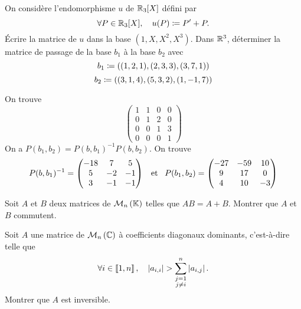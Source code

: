 \documentclass{magnolia}
\begin{document}
\begin{questions}
\question On considère l'endomorphisme $u$ de $\mathbb{R}_3[X]$ défini par
  \[\forall P\in\mathbb{R}_3[X] ,\quad u(P)\coloneqq P'+P.\]
  Écrire la matrice de $u$ dans la base $(1,X,X^2,X^3)$.
\question Dans $\mathbb{R}^3$, déterminer la matrice de passage de la base $b_1$ à la
  base $b_2$ avec
  \[b_1\coloneqq((1,2,1), (2,3,3), (3,7,1))\]
  \[b_2\coloneqq((3,1,4), (5,3,2), (1,-1,7))\]
\end{questions}
\begin{sol}
\begin{questions}
\question On trouve
  \[
  \begin{pmatrix}
  1 & 1 & 0 & 0\\
  0 & 1 & 2 & 0\\
  0 & 0 & 1 & 3\\
  0 & 0 & 0 & 1  
  \end{pmatrix}\]
\question On a $P(b_1,b_2)=P(b,b_1)^{-1}P(b,b_2)$. On trouve
  \[P(b,b_1)^{-1}=
  \begin{pmatrix}
  -18 & 7 & 5\\
  5 & -2 & -1\\
  3 & -1 & -1
  \end{pmatrix}
  \quad\!\text{et}\quad\! P(b_1,b_2)=
  \begin{pmatrix}
  -27 & -59 & 10\\
  9 & 17 & 0\\
  4 & 10 & -3 
  \end{pmatrix}\]
\end{questions}
\end{sol}

Soit $A$ et $B$ deux matrices de $\mathcal{M}_{n}\left(\mathbb{K}\right)$ telles que $AB=A+B$. Montrer
que $A$ et $B$ commutent.

Soit $A$ une matrice de $\mathcal{M}_{n}\left(\mathbb{C}\right)$ à coefficients diagonaux
  dominants, c'est-à-dire telle que
  \[\forall i\in\left\llbracket 1,n\right\rrbracket ,\quad \left|a_{i,i}\right| >
    \sum_{\substack{j=1\\ j\not=i}}^n \left|a_{i,j}\right|.\]
  Montrer que $A$ est inversible.
\end{document}
